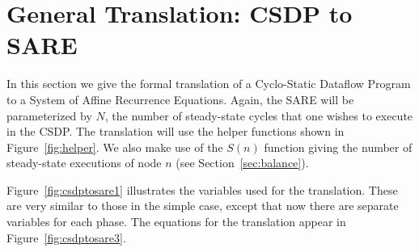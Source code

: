 \section{General Translation: CSDP to SARE}
\label{sec:translate}

In this section we give the formal translation of a Cyclo-Static
Dataflow Program to a System of Affine Recurrence Equations.  Again,
the SARE will be parameterized by $N$, the number of steady-state
cycles that one wishes to execute in the CSDP.  The translation will
use the helper functions shown in Figure~\ref{fig:helper}.  We also
make use of the $S(n)$ function giving the number of steady-state
executions of node $n$ (see Section~\ref{sec:balance}).  



Figure~\ref{fig:csdptosare1} illustrates the variables used for the
translation.  These are very similar to those in the simple case,
except that now there are separate variables for each phase.  The
equations for the translation appear in Figure~\ref{fig:csdptosare3}.